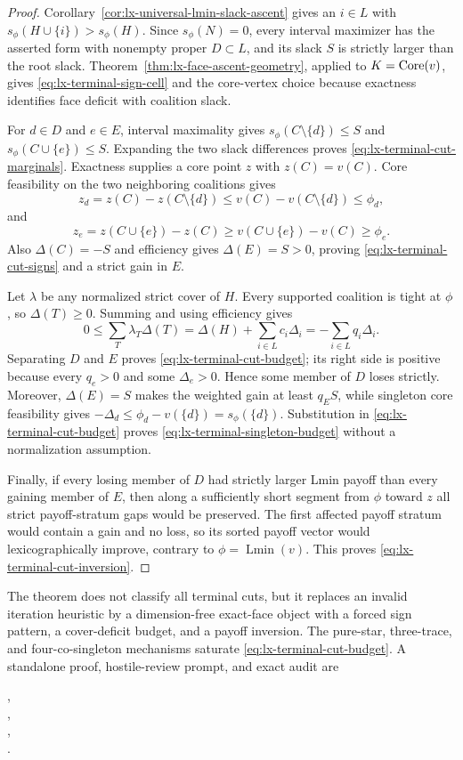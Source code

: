 \begin{proof}
Corollary~\ref{cor:lx-universal-lmin-slack-ascent} gives an $i\in L$ with
$s_\phi(H\cup\{i\})>s_\phi(H)$.  Since $s_\phi(N)=0$, every interval
maximizer has the asserted form with nonempty proper $D\subset L$, and its
slack $S$ is strictly larger than the root slack.
Theorem~\ref{thm:lx-face-ascent-geometry}, applied to $K=\operatorname{Core}(v)$, gives
\eqref{eq:lx-terminal-sign-cell} and the core-vertex choice because exactness
identifies face deficit with coalition slack.

For $d\in D$ and $e\in E$, interval maximality gives
$s_\phi(C\setminus\{d\})\leq S$ and
$s_\phi(C\cup\{e\})\leq S$.  Expanding the two slack differences proves
\eqref{eq:lx-terminal-cut-marginals}.  Exactness supplies a core point $z$
with $z(C)=v(C)$.  Core feasibility on the two neighboring coalitions gives
\[
 z_d=z(C)-z(C\setminus\{d\})
 \leq v(C)-v(C\setminus\{d\})\leq\phi_d,
\]
and
\[
 z_e=z(C\cup\{e\})-z(C)
 \geq v(C\cup\{e\})-v(C)\geq\phi_e.
\]
Also $\Delta(C)=-S$ and efficiency gives $\Delta(E)=S>0$, proving
\eqref{eq:lx-terminal-cut-signs} and a strict gain in $E$.

Let $\lambda$ be any normalized strict cover of $H$.  Every supported
coalition is tight at $\phi$, so $\Delta(T)\geq0$.  Summing and using
efficiency gives
\[
 0\leq\sum_T\lambda_T\Delta(T)
 =\Delta(H)+\sum_{i\in L}c_i\Delta_i
 =-\sum_{i\in L}q_i\Delta_i.
\]
Separating $D$ and $E$ proves
\eqref{eq:lx-terminal-cut-budget}; its right side is positive because every
$q_e>0$ and some $\Delta_e>0$.  Hence some member of $D$ loses strictly.
Moreover, $\Delta(E)=S$ makes the weighted gain at least $q_ES$, while
singleton core feasibility gives
$-\Delta_d\leq\phi_d-v(\{d\})=s_\phi(\{d\})$.
Substitution in \eqref{eq:lx-terminal-cut-budget} proves
\eqref{eq:lx-terminal-singleton-budget} without a normalization assumption.

Finally, if every losing member of $D$ had strictly larger Lmin payoff than
every gaining member of $E$, then along a sufficiently short segment from
$\phi$ toward $z$ all strict payoff-stratum gaps would be preserved.  The
first affected payoff stratum would contain a gain and no loss, so its sorted
payoff vector would lexicographically improve, contrary to
$\phi=\operatorname{Lmin}(v)$.  This proves
\eqref{eq:lx-terminal-cut-inversion}.
\end{proof}

The theorem does not classify all terminal cuts, but it replaces an invalid
iteration heuristic by a dimension-free exact-face object with a forced
sign pattern, a cover-deficit budget, and a payoff inversion.  The pure-star,
three-trace, and four-co-singleton mechanisms saturate
\eqref{eq:lx-terminal-cut-budget}.  A standalone proof, hostile-review
prompt, and exact audit are
\begin{center}
\small{},\\[-2pt]
\small{},\\[-2pt]
\small{},\\[-2pt]
\small{}.
\end{center}

